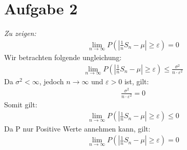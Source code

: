 \pagebreak
\section*{Aufgabe 2}
\emph{Zu zeigen:}
\begin{align*}
  \lim_{n \rightarrow \infty} P(|\frac{ 1 }{ n } S_n - \mu|\ge\varepsilon) = 0
\end{align*}
Wir betrachten folgende ungleichung:
\begin{align*}
  \lim_{n \rightarrow \infty} P(|\frac{ 1 }{ n } S_n - \mu|\ge\varepsilon)\le \frac{ \sigma^2 }{n\cdot\varepsilon^2 }
\end{align*}
Da $ \sigma^2 < \infty$, jedoch $ n \rightarrow \infty $ und $ \varepsilon > 0 $ ist, gilt:
\begin{align*}
  \frac{ \sigma^2 }{n\cdot\varepsilon^2 } = 0 
\end{align*}
Somit gilt:
\begin{align*}
  \lim_{n \rightarrow \infty} P(|\frac{ 1 }{ n } S_n - \mu|\ge\varepsilon) \le 0
\end{align*}
Da P nur Positive Werte annehmen kann, gilt:
\begin{align*}
  \lim_{n \rightarrow \infty} P(|\frac{ 1 }{ n } S_n - \mu|\ge\varepsilon) = 0
\end{align*}